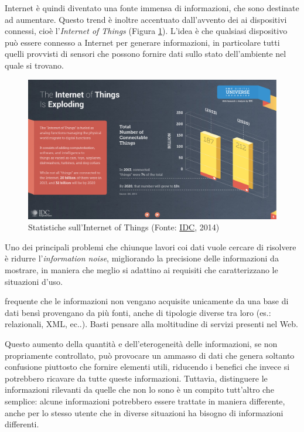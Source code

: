 Internet è quindi diventato una fonte immensa di informazioni, che sono destinate ad aumentare. Questo trend è inoltre accentuato dall'avvento dei ai dispositivi connessi, cioè l'\emph{Internet of Things} (Figura \ref{fig:statistiche-iot}). L'idea è che qualsiasi dispositivo può essere connesso a Internet per generare informazioni, in particolare tutti quelli provvisti di sensori che possono fornire dati sullo stato dell'ambiente nel quale si trovano.

\begin{figure}[ht]
	\centering
	\includegraphics[width=\textwidth]{1-introduzione/Immagini/iot-trend.pdf}
	\caption[Statistiche sull'Internet of Things]{Statistiche sull'Internet of Things (Fonte: \href{http://www.emc.com/leadership/digital-universe/2014iview/executive-summary.htm}{IDC}, 2014)\label{fig:statistiche-iot}}
\end{figure}

Uno dei principali problemi che chiunque lavori coi dati vuole cercare di risolvere è ridurre l'\emph{information noise}, migliorando la precisione delle informazioni da mostrare, in maniera che meglio si adattino ai requisiti che caratterizzano le situazioni d'uso.

\upe frequente che le informazioni non vengano acquisite unicamente da una base di dati bensì provengano da più fonti, anche di tipologie diverse tra loro (es.: relazionali, XML, ec..). Basti pensare alla moltitudine di servizi presenti nel Web.

Questo aumento della quantità e dell'eterogeneità delle informazioni, se non propriamente controllato, può provocare un ammasso di dati che genera soltanto confusione piuttosto che fornire elementi utili, riducendo i benefici che invece si potrebbero ricavare da tutte queste informazioni. Tuttavia, distinguere le informazioni rilevanti da quelle che non lo sono è un compito tutt'altro che semplice: alcune informazioni potrebbero essere trattate in maniera differente, anche per lo stesso utente che in diverse situazioni ha bisogno di informazioni differenti. 

